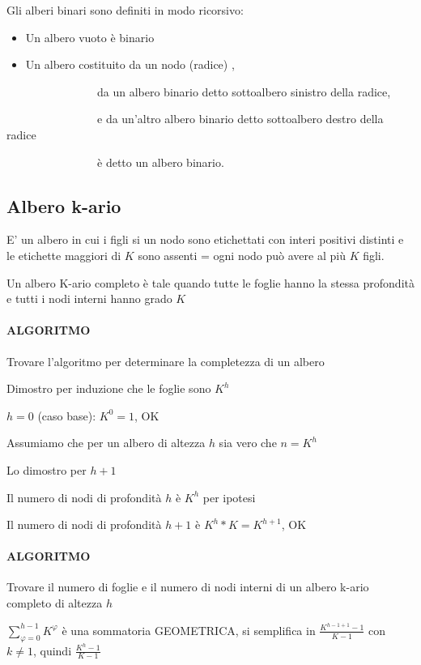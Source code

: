 \documentclass[tikz]{article}
\providecommand{\tightlist}{%
  \setlength{\itemsep}{0pt}\setlength{\parskip}{0pt}}
\let\oldparagraph\paragraph
\renewcommand{\paragraph}[1]{\oldparagraph{#1}\mbox{}}
\begin{document}
{{{Gli alberi binari sono definiti in modo ricorsivo:}

\begin{itemize}
\tightlist
\item
  {Un albero vuoto è binario}
\item
  {Un albero costituito da un nodo (radice) ,}
\end{itemize}

{~~~~~~~~~~~~~~~~da un albero binario detto sottoalbero sinistro della
radice,}

{~~~~~~~~~~~~~~~~e da un'altro albero binario detto sottoalbero destro
della radice}

{~~~~~~~~~~~~~~~~è detto un albero binario.}

\subsection{Albero k-ario}

{E' un albero in cui i figli si un nodo sono etichettati con interi positivi distinti e le etichette maggiori di $K$ sono assenti = ogni nodo può avere al più $K$ figli.}

{Un albero K-ario completo è tale quando tutte le foglie hanno la stessa profondità e tutti i nodi interni hanno grado $K$}

\paragraph{ALGORITMO}

{Trovare l'algoritmo per determinare la completezza di un albero}

{Dimostro per induzione che le foglie sono $K^h$}


{$h=0$ (caso base): $K^0=1$, OK}

{Assumiamo che per un albero di altezza $h$ sia vero che $n=K^h$}

{Lo dimostro per $h+1$}

{Il numero di nodi di profondità $h$ è $K^h$ per ipotesi}

{Il numero di nodi di profondità $h+1$ è $K^h*K=K^{h+1}$, OK}

\paragraph{ALGORITMO}

{Trovare il numero di foglie e il numero di nodi interni di un albero k-ario completo di altezza $h$}

{$\sum_{\varphi=0}^{h-1}{K^{\varphi}}$ è una sommatoria GEOMETRICA, si semplifica in $\frac{K^{h-1+1}-1}{K-1}$ con $k\neq 1$, quindi $\frac{K^h-1}{K-1}$}

}}
\end{document}
